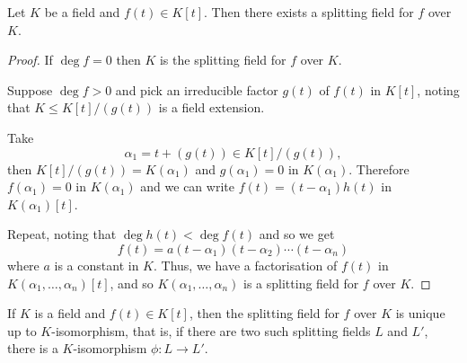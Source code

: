 \documentclass{article}
\begin{document}
\begin{nthm}\label{thm:1.23}
    Let $K$ be a field and $f(t) \in K[t]$. Then there exists a splitting field for $f$ over $K$.
\end{nthm}
\begin{proof}
    If $\deg f = 0$ then $K$ is the splitting field for $f$ over $K$.

    Suppose $\deg f > 0$ and pick an irreducible factor $g(t)$ of $f(t)$ in $K[t]$, noting that $K \leq K[t] / (g(t))$ is a field extension.

    Take
    \begin{equation*}\alpha_1 = t + (g(t)) \in K[t]/(g(t)),\end{equation*}
    then $K[t]/(g(t)) = K(\alpha_1)$ and $g(\alpha_1) = 0$ in $K(\alpha_1)$.
    Therefore $f(\alpha_1) = 0$ in $K(\alpha_1)$ and we can write $f(t) = (t-\alpha_1) h(t)$ in $K(\alpha_1)[t]$.

    Repeat, noting that $\deg h(t) < \deg f(t)$ and so we get
    \begin{equation*}f(t) = a(t - \alpha_1)(t - \alpha_2) \dotsm (t-\alpha_n)\end{equation*}
    where $a$ is a constant in $K$.
    Thus, we have a factorisation of $f(t)$ in $K(\alpha_1, \dotsc, \alpha_n)[t]$, and so $K(\alpha_1, \dotsc, \alpha_n)$ is a splitting field for $f$ over $K$.
\end{proof}
\begin{nthm}\label{thm:1.24}
    If $K$ is a field and $f(t) \in K[t]$, then the splitting field for $f$ over $K$ is unique up to $K$-isomorphism, that is, if there are two such splitting fields $L$ and $L'$, there is a $K$-isomorphism $\phi: L \to L'$.
\end{nthm}
\end{document}
